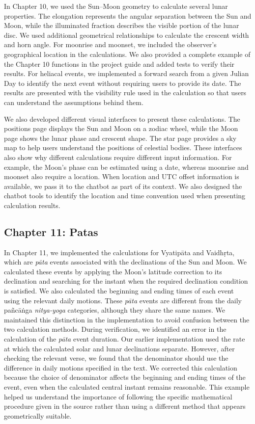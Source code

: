 \documentclass[12pt,a4paper,oneside]{report}
\begin{document}
In Chapter 10, we used the Sun--Moon geometry to calculate several lunar properties. The elongation represents the angular separation between the Sun and Moon, while the illuminated fraction describes the visible portion of the lunar disc. We used additional geometrical relationships to calculate the crescent width and horn angle. For moonrise and moonset, we included the observer's geographical location in the calculations. We also provided a complete example of the Chapter 10 functions in the project guide and added tests to verify their results. For heliacal events, we implemented a forward search from a given Julian Day to identify the next event without requiring users to provide its date. The results are presented with the visibility rule used in the calculation so that users can understand the assumptions behind them.

We also developed different visual interfaces to present these calculations. The positions page displays the Sun and Moon on a zodiac wheel, while the Moon page shows the lunar phase and crescent shape. The star page provides a sky map to help users understand the positions of celestial bodies. These interfaces also show why different calculations require different input information. For example, the Moon's phase can be estimated using a date, whereas moonrise and moonset also require a location. When location and UTC offset information is available, we pass it to the chatbot as part of its context. We also designed the chatbot tools to identify the location and time convention used when presenting calculation results.

\subsection{Chapter 11: Patas}

In Chapter 11, we implemented the calculations for Vyatipāta and Vaidhṛta, which are \emph{pāta} events associated with the declinations of the Sun and Moon. We calculated these events by applying the Moon's latitude correction to its declination and searching for the instant when the required declination condition is satisfied. We also calculated the beginning and ending times of each event using the relevant daily motions. These \emph{pāta} events are different from the daily pañcāṅga \emph{nitya-yoga} categories, although they share the same names. We maintained this distinction in the implementation to avoid confusion between the two calculation methods. During verification, we identified an error in the calculation of the \emph{pāta} event duration. Our earlier implementation used the rate at which the calculated solar and lunar declinations separate. However, after checking the relevant verse, we found that the denominator should use the difference in daily motions specified in the text. We corrected this calculation because the choice of denominator affects the beginning and ending times of the event, even when the calculated central instant remains reasonable. This example helped us understand the importance of following the specific mathematical procedure given in the source rather than using a different method that appears geometrically suitable.
\end{document}
